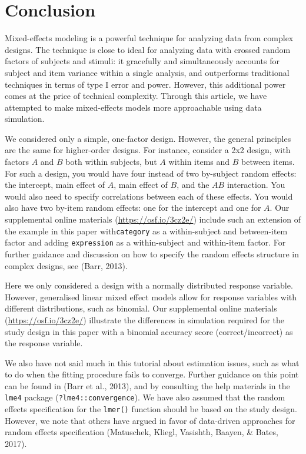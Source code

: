 \documentclass[doc,floatsintext]{apa6}
\begin{document}
\section{Conclusion}\label{conclusion}

Mixed-effects modeling is a powerful technique for analyzing data from
complex designs. The technique is close to ideal for analyzing data with
crossed random factors of subjects and stimuli: it gracefully and
simultaneously accounts for subject and item variance within a single
analysis, and outperforms traditional techniques in terms of type I
error and power. However, this additional power comes at the price of
technical complexity. Through this article, we have attempted to make
mixed-effects models more approachable using data simulation.

We considered only a simple, one-factor design. However, the general
principles are the same for higher-order designs. For instance, consider
a 2x2 design, with factors \(A\) and \(B\) both within subjects, but
\(A\) within items and \(B\) between items. For such a design, you would
have four instead of two by-subject random effects: the intercept, main
effect of \(A\), main effect of \(B\), and the \(AB\) interaction. You
would also need to specify correlations between each of these effects.
You would also have two by-item random effects: one for the intercept
and one for \(A\). Our supplemental online materials
(\url{https://osf.io/3cz2e/}) include such an extension of the example
in this paper with\texttt{category} as a within-subject and between-item
factor and adding \texttt{expression} as a within-subject and
within-item factor. For further guidance and discussion on how to
specify the random effects structure in complex designs, see (Barr,
2013).

Here we only considered a design with a normally distributed response
variable. However, generalised linear mixed effect models allow for
response variables with different distributions, such as binomial. Our
supplemental online materials (\url{https://osf.io/3cz2e/}) illustrate
the differences in simulation required for the study design in this
paper with a binomial accuracy score (correct/incorrect) as the response
variable.

We also have not said much in this tutorial about estimation issues,
such as what to do when the fitting procedure fails to converge. Further
guidance on this point can be found in (Barr et al., 2013), and by
consulting the help materials in the \texttt{lme4} package
(\texttt{?lme4::convergence}). We have also assumed that the random
effects specification for the \texttt{lmer()} function should be based
on the study design. However, we note that others have argued in favor
of data-driven approaches for random effects specification (Matuschek,
Kliegl, Vasishth, Baayen, \& Bates, 2017).
\end{document}
